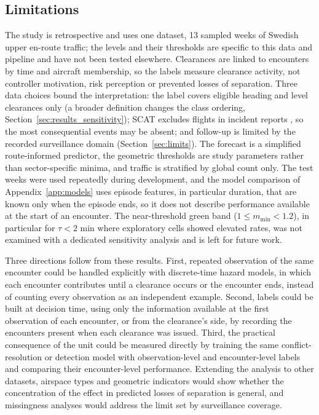 \documentclass[aerospace,article,submit,moreauthors]{Definitions/mdpi}
\newcommand{\mmin}{m_{\min}}
\begin{document}
\subsection{Limitations}\label{sec:limitations}
The study is retrospective and uses one dataset, 13 sampled weeks of Swedish upper en-route traffic; the levels and their thresholds are specific to this data and pipeline and have not been tested elsewhere. Clearances are linked to encounters by time and aircraft membership, so the labels measure clearance activity, not controller motivation, risk perception or prevented losses of separation. Three data choices bound the interpretation: the label covers eligible heading and level clearances only (a broader definition changes the class ordering, Section~\ref{sec:results_sensitivity}); SCAT excludes flights in incident reports \cite{nilsson2023}, so the most consequential events may be absent; and follow-up is limited by the recorded surveillance domain (Section~\ref{sec:limits}). The forecast is a simplified route-informed predictor, the geometric thresholds are study parameters rather than sector-specific minima, and traffic is stratified by global count only. The test weeks were used repeatedly during development, and the model comparison of Appendix~\ref{app:models} uses episode features, in particular duration, that are known only when the episode ends, so it does not describe performance available at the start of an encounter. The near-threshold green band ($1\le\mmin<1.2$), in particular for $\tau<2$ min where exploratory cells showed elevated rates, was not examined with a dedicated sensitivity analysis and is left for future work.

Three directions follow from these results. First, repeated observation of the same encounter could be handled explicitly with discrete-time hazard models, in which each encounter contributes until a clearance occurs or the encounter ends, instead of counting every observation as an independent example. Second, labels could be built at decision time, using only the information available at the first observation of each encounter, or from the clearance's side, by recording the encounters present when each clearance was issued. Third, the practical consequence of the unit could be measured directly by training the same conflict-resolution or detection model with observation-level and encounter-level labels and comparing their encounter-level performance. Extending the analysis to other datasets, airspace types and geometric indicators would show whether the concentration of the effect in predicted losses of separation is general, and missingness analyses would address the limit set by surveillance coverage.
\end{document}
